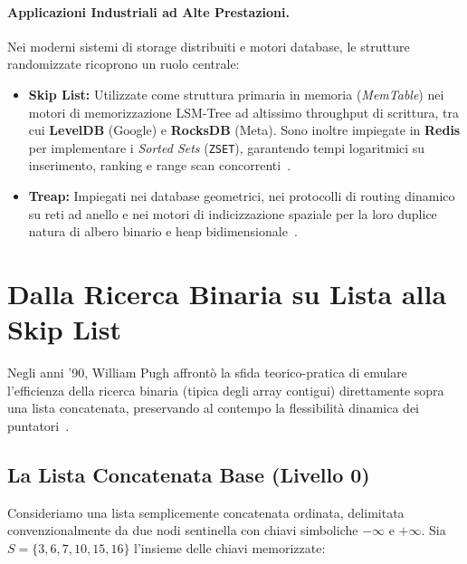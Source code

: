 \paragraph{Applicazioni Industriali ad Alte Prestazioni.}
Nei moderni sistemi di storage distribuiti e motori database, le strutture randomizzate ricoprono un ruolo centrale:
\begin{itemize}
  \item \textbf{Skip List:} Utilizzate come struttura primaria in memoria (\textit{MemTable}) nei motori di memorizzazione LSM-Tree ad altissimo throughput di scrittura, tra cui \textbf{LevelDB} (Google) e \textbf{RocksDB} (Meta). Sono inoltre impiegate in \textbf{Redis} per implementare i \textit{Sorted Sets} (\texttt{ZSET}), garantendo tempi logaritmici su inserimento, ranking e range scan concorrenti~\cite{pugh1990}.
  \item \textbf{Treap:} Impiegati nei database geometrici, nei protocolli di routing dinamico su reti ad anello e nei motori di indicizzazione spaziale per la loro duplice natura di albero binario e heap bidimensionale~\cite{seidel1996}.
\end{itemize}

\FloatBarrier
\section{Dalla Ricerca Binaria su Lista alla Skip List}
\label{sec:binary-search-to-skip-list}

Negli anni '90, William Pugh affrontò la sfida teorico-pratica di emulare l'efficienza della ricerca binaria (tipica degli array contigui) direttamente sopra una lista concatenata, preservando al contempo la flessibilità dinamica dei puntatori~\cite{pugh1990}.

\subsection{La Lista Concatenata Base (Livello 0)}
Consideriamo una lista semplicemente concatenata ordinata, delimitata convenzionalmente da due nodi sentinella con chiavi simboliche $-\infty$ e $+\infty$. Sia $S = \{3, 6, 7, 10, 15, 16\}$ l'insieme delle chiavi memorizzate:

